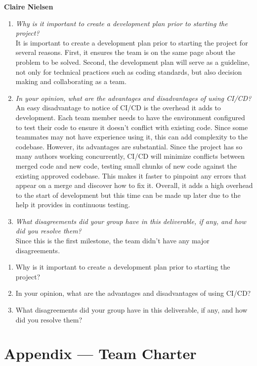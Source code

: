 \documentclass{article}
\begin{document}
\textbf{Claire Nielsen}
\begin{enumerate}
    \item \textit{Why is it important to create a development plan prior to starting the project?}\\
    It is important to create a development plan prior to starting the project for several reasons. First, it ensures the team is on the same page about the problem to be solved. Second, the development plan will serve as a guideline, not only for technical practices such as coding standards, but also decision making and collaborating as a team.
    \item \textit{In your opinion, what are the advantages and disadvantages of using CI/CD?}\\
    An easy disadvantage to notice of CI/CD is the overhead it adds to development. Each team member needs to have the environment configured to test their code to ensure it doesn’t conflict with existing code. Since some teammates may not have experience using it, this can add complexity to the codebase. However, its advantages are substantial. Since the project has so many authors working concurrently, CI/CD will minimize conflicts between merged code and new code, testing small chunks of new code against the existing approved codebase. This makes it faster to pinpoint any errors that appear on a merge and discover how to fix it. Overall, it adds a high overhead to the start of development but this time can be made up later due to the help it provides in continuous testing. 
    \item \textit{What disagreements did your group have in this deliverable, if any, and how did you resolve them?}\\
    Since this is the first milestone, the team didn’t have any major disagreements. 
\end{enumerate}

\begin{enumerate}
    \item Why is it important to create a development plan prior to starting the
    project?
    \item In your opinion, what are the advantages and disadvantages of using
    CI/CD?
    \item What disagreements did your group have in this deliverable, if any,
    and how did you resolve them?
\end{enumerate}

\newpage{}

\section*{Appendix --- Team Charter}
\end{document}
